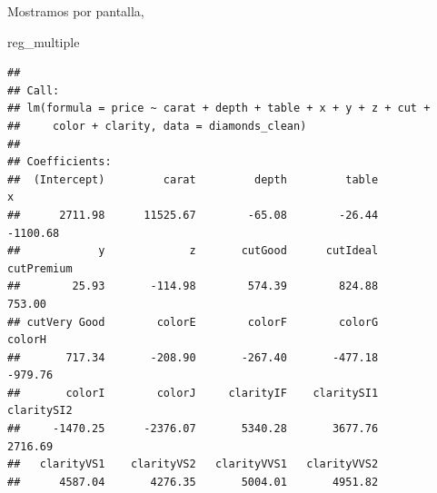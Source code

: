 \documentclass[
  spanish,
]{article}
\newenvironment{Shaded}{\begin{snugshade}}{\end{snugshade}}
\newcommand{\AttributeTok}[1]{\textcolor[rgb]{0.13,0.29,0.53}{#1}}
\newcommand{\FunctionTok}[1]{\textcolor[rgb]{0.13,0.29,0.53}{\textbf{#1}}}
\newcommand{\NormalTok}[1]{#1}
\newcommand{\OtherTok}[1]{\textcolor[rgb]{0.56,0.35,0.01}{#1}}
\newcommand{\SpecialCharTok}[1]{\textcolor[rgb]{0.81,0.36,0.00}{\textbf{#1}}}
\begin{document}
\begin{Shaded}
\end{Shaded}

Mostramos por pantalla,

\begin{Shaded}
\begin{Highlighting}[]
\NormalTok{reg\_multiple}
\end{Highlighting}
\end{Shaded}

\begin{verbatim}
## 
## Call:
## lm(formula = price ~ carat + depth + table + x + y + z + cut + 
##     color + clarity, data = diamonds_clean)
## 
## Coefficients:
##  (Intercept)         carat         depth         table             x  
##      2711.98      11525.67        -65.08        -26.44      -1100.68  
##            y             z       cutGood      cutIdeal    cutPremium  
##        25.93       -114.98        574.39        824.88        753.00  
## cutVery Good        colorE        colorF        colorG        colorH  
##       717.34       -208.90       -267.40       -477.18       -979.76  
##       colorI        colorJ     clarityIF    claritySI1    claritySI2  
##     -1470.25      -2376.07       5340.28       3677.76       2716.69  
##   clarityVS1    clarityVS2   clarityVVS1   clarityVVS2  
##      4587.04       4276.35       5004.01       4951.82
\end{verbatim}
\end{document}
